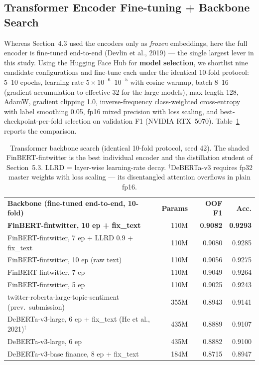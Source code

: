 \documentclass[11pt,a4paper]{article}
\newcommand{\tH}[1]{\textcolor{maincolor}{\textbf{#1}}}
\newcommand{\gmid}{\arrayrulecolor{maincolor}\midrule\arrayrulecolor{black}}
\begin{document}
\subsection{Transformer Encoder Fine-tuning + Backbone Search}
Whereas Section~4.3 used the encoders only as \emph{frozen} embeddings, here the full encoder is
fine-tuned end-to-end (Devlin et al., 2019) --- the single largest lever in this study. Using the
Hugging Face Hub for \textbf{model selection}, we shortlist nine candidate configurations and
fine-tune each under the identical 10-fold protocol: 5--10 epochs, learning rate
$5\times10^{-6}$--$10^{-5}$ with cosine warmup, batch 8--16 (gradient accumulation to effective 32
for the large models), max length 128, AdamW, gradient clipping 1.0, inverse-frequency
class-weighted cross-entropy with label smoothing 0.05, fp16 mixed precision with loss scaling, and
best-checkpoint-per-fold selection on validation F1 (NVIDIA RTX~5070).
Table~\ref{tab:backbones} reports the comparison.

\begin{table}[H]
  \centering
  \footnotesize
  \setlength{\tabcolsep}{5pt}
  \begin{tabularx}{\linewidth}{@{}>{\raggedright\arraybackslash}X r r r@{}}
    \toprule
    \tH{Backbone (fine-tuned end-to-end, 10-fold)} & \tH{Params} & \tH{OOF F1} & \tH{Acc.} \\
    \gmid
    \rowcolor{lightgray} \textbf{FinBERT-fintwitter, 10 ep + fix\_text} & 110M & \textbf{0.9082} & \textbf{0.9293} \\
    FinBERT-fintwitter, 7 ep + LLRD 0.9 + fix\_text         & 110M & 0.9080 & 0.9285 \\
    FinBERT-fintwitter, 10 ep (raw text)                    & 110M & 0.9056 & 0.9275 \\
    FinBERT-fintwitter, 7 ep                                & 110M & 0.9049 & 0.9264 \\
    FinBERT-fintwitter, 5 ep                                & 110M & 0.9025 & 0.9243 \\
    twitter-roberta-large-topic-sentiment (prev.\ submission) & 355M & 0.8943 & 0.9141 \\
    DeBERTa-v3-large, 6 ep + fix\_text (He et al., 2021)$^\dagger$ & 435M & 0.8889 & 0.9107 \\
    DeBERTa-v3-large, 6 ep                                  & 435M & 0.8882 & 0.9100 \\
    DeBERTa-v3-base finance, 8 ep + fix\_text               & 184M & 0.8715 & 0.8947 \\
    \bottomrule
  \end{tabularx}
  \caption{Transformer backbone search (identical 10-fold protocol, seed 42). The shaded
  FinBERT-fintwitter is the best individual encoder and the distillation student of Section~5.3.
  LLRD = layer-wise learning-rate decay. $^\dagger$DeBERTa-v3 requires fp32 master weights with
  loss scaling --- its disentangled attention overflows in plain fp16.}
  \label{tab:backbones}
\end{table}
\end{document}
